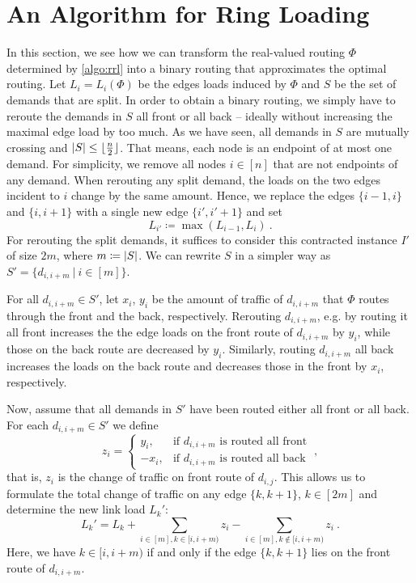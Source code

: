 \section{An Algorithm for Ring Loading}
\label{sec:ring-loading}

In this section, we see how we can transform the real-valued routing $\Phi$ determined by \cref{algo:rrl} into a binary routing that approximates the optimal routing.
Let $L_i = L_i(\Phi)$ be the edges loads induced by $\Phi$ and $S$ be the set of demands that are split.
In order to obtain a binary routing, we simply have to reroute the demands in $S$ all front or all back -- ideally without increasing the maximal edge load by too much. 
As we have seen, all demands in $S$ are mutually crossing and $\abs{S} \leq \lfloor \frac{n}{2} \rfloor$.
That means, each node is an endpoint of at most one demand.
For simplicity, we remove all nodes $i \in [n]$ that are not endpoints of any demand.
When rerouting any split demand, the loads on the two edges incident to $i$ change by the same amount.
Hence, we replace the edges $\{i-1, i\}$ and $\{i, i+1\}$ with a single new edge $\{i', i'+1\}$ and set 
\begin{equation}
	L_{i'} \coloneqq \max(L_{i-1}, L_i) \ .
\end{equation}
For rerouting the split demands, it suffices to consider this contracted instance $I'$ of size $2m$, where $m \coloneqq \abs{S}$.
We can rewrite $S$ in a simpler way as $S' = \{d_{i, i+m}\ |\ i \in [m]\}$.

For all $d_{i, i+m} \in S'$, let $x_i$, $y_i$ be the amount of traffic of $d_{i, i+m}$ that $\Phi$ routes through the front and the back, respectively.
Rerouting $d_{i, i+m}$, e.g. by routing it all front increases the the edge loads on the front route of $d_{i, i+m}$ by $y_i$, while those on the back route are decreased by $y_i$.
Similarly, routing $d_{i, i+m}$ all back increases the loads on the back route and decreases those in the front by $x_i$, respectively.

Now, assume that all demands in $S'$ have been routed either all front or all back.
For each $d_{i, i+m} \in S'$ we define
\begin{equation}
	z_i = \begin{cases}
		y_i, &\text{if } d_{i, i+m} \text{ is routed all front} \\
		-x_i, &\text{if } d_{i, i+m} \text{ is routed all back}
	\end{cases} \ ,
\end{equation}
that is, $z_i$ is the change of traffic on front route of $d_{i, j}$.
This allows us to formulate the total change of traffic on any edge $\{k, k+1\}$, $k \in [2m]$ and determine the new link load $L_k'$:
\begin{equation}
	\label{eq:load-change}
	L_k' = L_k + \sum_{i \in [m], k \in [i, i+m)} z_i - \sum_{i \in [m], k \notin [i, i+m)} z_i \ .
\end{equation}
Here, we have $k \in [i, i+m)$ if and only if the edge $\{k,k+1\}$ lies on the front route of $d_{i, i+m}$.



